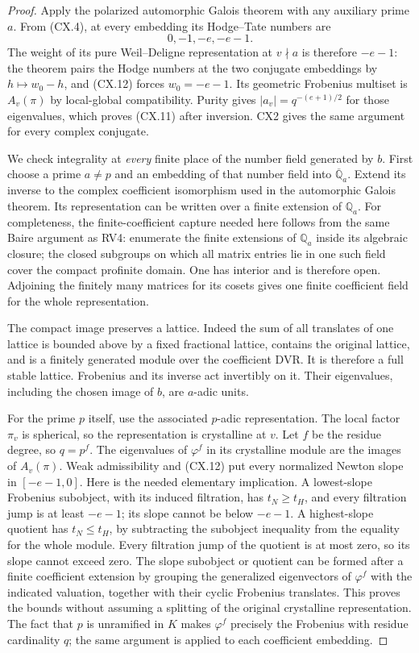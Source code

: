\begin{proof}
Apply the polarized automorphic Galois theorem with any
auxiliary prime $a$.  From (CX.4), at every embedding its
Hodge--Tate numbers are
\[
                     0,-1,-e,-e-1.                          \tag{CX.12}
\]
The weight of its pure Weil--Deligne representation at
$v\nmid a$ is therefore $-e-1$: the theorem pairs the Hodge
numbers at the two conjugate embeddings by $h\mapsto w_0-h$,
and (CX.12) forces $w_0=-e-1$.  Its geometric Frobenius
multiset is $A_v(\pi)$ by local-global compatibility.  Purity
gives $|a_v|=q^{-(e+1)/2}$ for those eigenvalues, which proves
(CX.11) after inversion.  CX2 gives the same argument for every
complex conjugate.

We check integrality at \emph{every} finite place of the number
field generated by $b$.  First choose a prime $a\ne p$ and an
embedding of that number field into
$\overline{\mathbb Q}_a$.  Extend its inverse to the complex
coefficient isomorphism used in the automorphic Galois theorem.
Its representation can be written over a finite extension of
$\mathbb Q_a$.  For completeness, the finite-coefficient
capture needed here follows from the same Baire argument as
RV4: enumerate the finite extensions of $\mathbb Q_a$ inside
its algebraic closure; the closed subgroups on which all matrix
entries lie in one such field cover the compact profinite
domain.  One has interior and is therefore open.  Adjoining
the finitely many matrices for its cosets gives one finite
coefficient field for the whole representation.

The compact image preserves a lattice.  Indeed the sum of all
translates of one lattice is bounded above by a fixed
fractional lattice, contains the original lattice, and is a
finitely generated module over the coefficient DVR.  It is
therefore a full stable lattice.  Frobenius and its inverse
act invertibly on it.  Their eigenvalues, including the chosen
image of $b$, are $a$-adic units.

For the prime $p$ itself, use the associated $p$-adic
representation.  The local factor $\pi_v$ is spherical, so
the representation is crystalline at $v$.  Let $f$ be the
residue degree, so $q=p^f$.  The eigenvalues of $\varphi^f$ in
its crystalline module are the images of $A_v(\pi)$.  Weak
admissibility and (CX.12) put every normalized Newton slope in
$[-e-1,0]$.  Here is the needed elementary implication.  A
lowest-slope Frobenius subobject, with its induced filtration,
has $t_N\ge t_H$, and every filtration jump is at least
$-e-1$; its slope cannot be below $-e-1$.  A highest-slope
quotient has $t_N\le t_H$, by subtracting the subobject
inequality from the equality for the whole module.  Every
filtration jump of the quotient is at most zero, so its slope
cannot exceed zero.  The slope subobject or quotient can be
formed after a finite coefficient extension by grouping the
generalized eigenvectors of $\varphi^f$ with the indicated
valuation, together with their cyclic Frobenius translates.
This proves the bounds without assuming a splitting of the
original crystalline representation.  The fact that $p$ is
unramified in $K$ makes $\varphi^f$ precisely the Frobenius
with residue cardinality $q$; the same argument is applied to
each coefficient embedding.


\end{proof}
